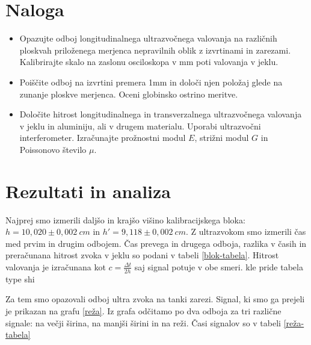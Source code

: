 \documentclass[12pt]{article}
\begin{document}
\section{Naloga}

\begin{itemize}
    \item Opazujte odboj longitudinalnega ultrazvočnega valovanja na različnih ploskvah priloženega merjenca nepravilnih oblik z izvrtinami in zarezami. Kalibrirajte skalo na zaslonu osciloskopa v mm poti valovanja v jeklu.
    \item Poiščite odboj na izvrtini premera 1mm in določi njen položaj glede na zunanje ploskve merjenca. Oceni globinsko ostrino meritve.
    \item Določite hitrost longitudinalnega in transverzalnega ultrazvočnega valovanja v jeklu in aluminiju, ali v drugem materialu. Uporabi ultrazvočni interferometer. Izračunajte prožnostni modul $E$, strižni modul $G$ in Poissonovo število $\mu$.
\end{itemize}

\section{Rezultati in analiza}

Najprej smo izmerili daljšo in krajšo višino kalibracijskega bloka: $h = 10,020 \pm 0,002\ cm$ in $h' = 9,118\pm 0,002\ cm$. Z ultrazvokom smo izmerili čas med prvim in drugim odbojem. Čas prevega in drugega odboja, razlika v časih in preračunana hitrost zvoka v jeklu so podani v tabeli \ref{blok-tabela}. Hitrost valovanja je izračunana kot $c = \frac{\Delta t}{2h}$ saj signal potuje v obe smeri.
\bigskip
kle pride tabela type shi
\bigskip

Za tem smo opazovali odboj ultra zvoka na tanki zarezi. Signal, ki smo ga prejeli je prikazan na grafu \ref{reža}. Iz grafa odčitamo po dva odboja za tri različne signale: na večji širina, na manjši širini in na reži. Časi signalov so v tabeli \ref{reža-tabela}
\end{document}
